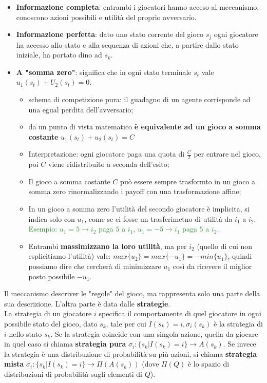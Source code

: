 \documentclass{article}
\begin{document}
\begin{itemize}
    \item \textbf{Informazione completa}: entrambi i giocatori hanno acceso al meccanismo, conoscono azioni possibili e utilità del proprio avversario.
    \item \textbf{Informazione perfetta}: dato uno stato corrente del gioco $s_j$ ogni giocatore ha accesso allo stato e alla sequenza di azioni che, a partire dallo stato iniziale, ha portato dino ad $s_k$.
    \item \textbf{A "somma zero"}: significa che in ogni stato terminale $s_t$ vale $u_1(s_t)+U_2(s_t)=0$.
    \begin{itemize}
        \item schema di competizione pura: il guadagno di un agente corrisponde ad una egual perdita dell'avversario;
        \item da un punto di vista matematico \textbf{è equivalente ad un gioco a somma costante} $u_1(s_t)+u_2(s_t)=C$
        \item Interpretazione: ogni giocatore paga una quota di $\frac{C}{2}$ per entrare nel gioco, poi $C$ viene ridistribuito a seconda dell'esito;
        \item Il gioco a somma costante $C$ può essere sempre trasformto in un gioco a somma zero rinormalizzando i payoff con una trasformazione affine;
        \item In un gioco a somma zero l'utilità del secondo giocatore è implicita, si indica solo con $u_1$, come se ci fosse un trasferimetno di utilità da $i_1$ a $i_2$. \textcolor{ForestGreen}{Esempio: $u_1=5 \rightarrow i_2$ paga $5$ a $i_1$, $u_1=-5 \rightarrow i_1$ paga $5$ a $i_2$}.
        \item Entrambi \textbf{massimizzano la loro utilità}, ma per $i_2$ (quello di cui non esplicitiamo l'utilità) vale: $max\{u_2\} = max\{-u_1\}= -min\{u_1\}$, quindi possiamo dire che cercherà di minimizzare $u_1$ così da ricevere il miglior posto possibile $-u_1$.
    \end{itemize}
\end{itemize} 
Il meccanismo descriver le "regole" del gioco, ma rappresenta solo una parte della sua descrizione.
L'altra parte è data dalle \textbf{strategie}.
\\ La strategia di un giocatore $i$ specifica il comportamente di quel giocatore in ogni possibile stato del gioco, dato $s_k$, tale per cui $I(s_k)=i,\sigma_i(s_k)$ è la strategia di $i$ nello stato $s_k$. Se la strategia coincide con una singola azione, quella da giocare in quel caso si chiama \textbf{strategia pura} $\sigma_i:\{s_k | I(s_k)=i\} \rightarrow A(s_k)$. Se invece la strategia è una distribuzione di probabilità su più azioni, si chiama \textbf{strategia mista} $\sigma_i:\{s_k|I(s_k)=i\} \rightarrow \Pi(A(s_k))$ (dove $\Pi(Q)$ è lo spazio di distribuzioni di probabilità sugli elementi di $Q$).
\end{document}
